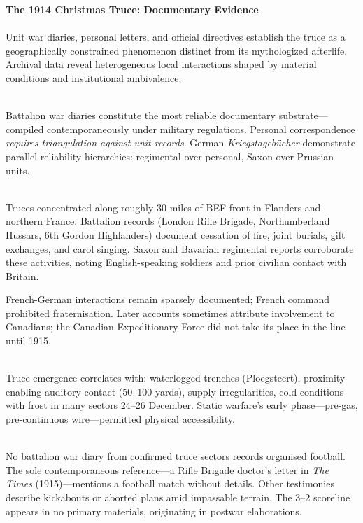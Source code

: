 \begin{technical}
{\Large\textbf{The 1914 Christmas Truce: Documentary Evidence}}\\[0.3em]

\\[0.5em]
Unit war diaries, personal letters, and official directives establish the truce as a geographically constrained phenomenon distinct from its mythologized afterlife. Archival data reveal heterogeneous local interactions shaped by material conditions and institutional ambivalence.

\\[0.5em]
Battalion war diaries constitute the most reliable documentary substrate—compiled contemporaneously under military regulations. Personal correspondence \textit{requires triangulation against unit records}. German \textit{Kriegstagebücher} demonstrate parallel reliability hierarchies: regimental over personal, Saxon over Prussian units.

\\[0.5em]
Truces concentrated along roughly 30 miles of BEF front in Flanders and northern France. Battalion records (London Rifle Brigade, Northumberland Hussars, 6th Gordon Highlanders) document cessation of fire, joint burials, gift exchanges, and carol singing. Saxon and Bavarian regimental reports corroborate these activities, noting English-speaking soldiers and prior civilian contact with Britain.

French-German interactions remain sparsely documented; French command prohibited fraternisation. Later accounts sometimes attribute involvement to Canadians; the Canadian Expeditionary Force did not take its place in the line until 1915.

\\[0.5em]
Truce emergence correlates with: waterlogged trenches (Ploegsteert), proximity enabling auditory contact (50–100 yards), supply irregularities, cold conditions with frost in many sectors 24–26 December. Static warfare's early phase—pre-gas, pre-continuous wire—permitted physical accessibility.

\\[0.5em]
No battalion war diary from confirmed truce sectors records organised football. The sole contemporaneous reference—a Rifle Brigade doctor's letter in \textit{The Times} (1915)—mentions \QSOpen{}a football match\QSClose{} without details. Other testimonies describe \QSOpen{}kickabouts\QSClose{} or aborted plans amid impassable terrain. The \QSOpen{}3–2\QSClose{} scoreline appears in no primary materials, originating in postwar elaborations. 


\end{technical}
